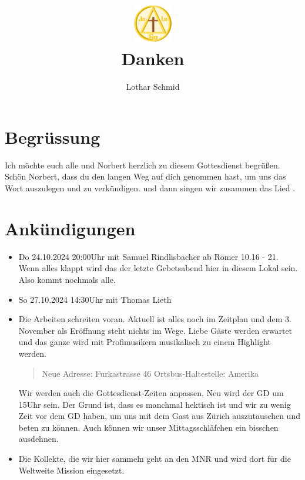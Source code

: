 \documentclass{../inc/mybib}
\title{\includegraphics[height=48pt]{../assets/images/logo.png}\\Danken}
\author{Lothar Schmid}
\begin{document}
\maketitle
\section{Begrüssung}

Ich möchte euch alle und Norbert herzlich zu diesem Gottesdienst begrüßen.
Schön Norbert, dass du den langen Weg auf dich genommen hast, um uns das Wort auszulegen und zu verkündigen. 
\beten{} und dann singen wir zusammen das Lied .

\section{Ankündigungen}
\begin{itemize}
    \item {} Do 24.10.2024 20:00Uhr mit Samuel Rindlisbacher ab Römer 10.16 - 21. Wenn alles klappt wird das der letzte Gebetsabend hier in diesem Lokal sein. Also kommt nochmals alle.
    \item {} So 27.10.2024 14:30Uhr mit Thomas Lieth
    \item {} Die Arbeiten schreiten voran. Aktuell ist alles noch im Zeitplan und dem 3. November als Eröffnung steht nichts im Wege. Liebe Gäste werden erwartet und das ganze wird mit Profimusikern musikalisch zu einem Highlight werden.
    \begin{quote}
        Neue Adresse:
        Furkastrasse 46
        Ortsbus-Haltestelle: Amerika
    \end{quote}
    Wir werden auch die Gottesdienst-Zeiten anpassen. Neu wird der GD um 15Uhr sein. Der Grund ist, dass es manchmal hektisch ist und wir zu wenig Zeit vor dem GD haben, um uns mit dem Gast aus Zürich auszutauschen und beten zu können. Auch können wir unser Mittagsschläfchen ein bisschen ausdehnen.
    \item Die Kollekte, die wir hier sammeln geht an den MNR und wird dort für die Weltweite Mission eingesetzt.    
\end{itemize}
\end{document}
